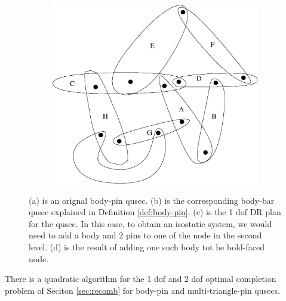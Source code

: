\begin{figure}
\begin{subfigure}{0.3\linewidth}
\begin{tikzpicture}
    \end{tikzpicture}
    \caption{}
\end{subfigure}
\begin{subfigure}{0.2\linewidth}\centering
    \includegraphics[width=\linewidth]{img/bodypin2}
    \caption{}
\end{subfigure}

    
\caption{(a) is an orignal body-pin qusec. (b) is the corresponding body-bar qusec explained in Definition \ref{def:body-pin}. (c) is the 1 dof DR plan for the qusec. In this case, to obtain an isostatic system, we would need to add a body and 2 pins to one of the node in the second level. (d) is the result of adding one such body tot he bold-faced node.}

\end{figure}

\begin{theorem}
    There is a quadratic algorithm for the 1 dof and 2 dof optimal completion problem of Seciton \ref{sec:recomb} for body-pin and multi-triangle-pin qusecs.
\end{theorem}

